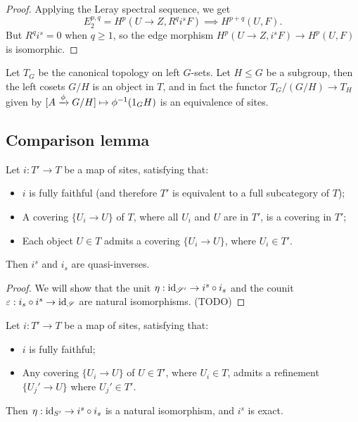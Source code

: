\documentclass[11pt]{amsart}
\begin{document}
\begin{proof}
    Applying the Leray spectral sequence, we get
    \[E_2^{p,q} = H^p(U\to Z, R^qi^sF) \implies H^{p+q}(U, F).\]
    But $R^qi^s = 0$ when $q\ge 1$, so the edge morphism $H^p(U\to Z, i^sF)\to H^p(U,F)$ is isomorphic.
\end{proof}

\begin{exm}
    Let $T_G$ be the canonical topology on left $G$-sets. Let $H\le G$ be a subgroup, then the left cosets $G/H$ is an object in $T$, and in fact the functor $T_G/(G/H) \to T_H$ given by $[A\xrightarrow{\phi} G/H]\mapsto \phi^{-1}(1_GH)$ is an equivalence of sites.
\end{exm}



\subsection{Comparison lemma}

\begin{thm}
\label{comparison_lem}
    Let $i:T'\to T$ be a map of sites, satisfying that:
    \begin{itemize}
        \item $i$ is fully faithful (and therefore $T'$ is equivalent to a full subcategory of $T$);
        \item A covering $\{U_i\to U\}$ of $T$, where all $U_i$ and $U$ are in $T'$, is a covering in $T'$;
        \item Each object $U\in T$ admits a covering $\{U_i\to U\}$, where $U_i\in T'$.
    \end{itemize}
    Then $i^s$ and $i_s$ are quasi-inverses.
\end{thm}

\begin{proof}
    We will show that the unit $\eta: \operatorname{id}_{\mathscr{S}'} \to i^s\circ i_s$ and the counit $\varepsilon: i_s\circ i^s\to \operatorname{id}_{\mathscr{S}}$ are natural isomorphisms. (TODO)
\end{proof}


\begin{cor}
    Let $i:T'\to T$ be a map of sites, satisfying that:
    \begin{itemize}
        \item $i$ is fully faithful;
        \item Any covering $\{U_i\to U\}$ of $U\in T'$, where $U_i\in T$, admits a refinement $\{U_j'\to U\}$ where $U_j' \in T'$.
    \end{itemize}
    Then $\eta: \operatorname{id}_{S'}\to i^s\circ i_s$ is a natural isomorphism, and $i^s$ is exact.
\end{cor}
\end{document}
